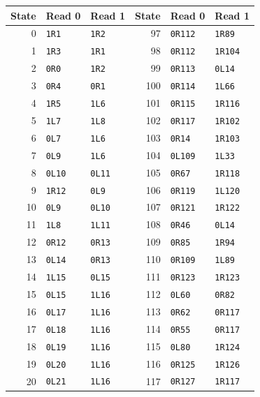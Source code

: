 \begingroup\small\setlength{\tabcolsep}{9pt}
\begin{longtable}{@{}rll@{\hspace{24pt}}rll@{}}
\toprule State & Read 0 & Read 1 & State & Read 0 & Read 1\\\midrule\endhead
0 & \texttt{1R1} & \texttt{1R2} & 97 & \texttt{0R112} & \texttt{1R89}\\
1 & \texttt{1R3} & \texttt{1R1} & 98 & \texttt{0R112} & \texttt{1R104}\\
2 & \texttt{0R0} & \texttt{1R2} & 99 & \texttt{0R113} & \texttt{0L14}\\
3 & \texttt{0R4} & \texttt{0R1} & 100 & \texttt{0R114} & \texttt{1L66}\\
4 & \texttt{1R5} & \texttt{1L6} & 101 & \texttt{0R115} & \texttt{1R116}\\
5 & \texttt{1L7} & \texttt{1L8} & 102 & \texttt{0R117} & \texttt{1R102}\\
6 & \texttt{0L7} & \texttt{1L6} & 103 & \texttt{0R14} & \texttt{1R103}\\
7 & \texttt{0L9} & \texttt{1L6} & 104 & \texttt{0L109} & \texttt{1L33}\\
8 & \texttt{0L10} & \texttt{0L11} & 105 & \texttt{0R67} & \texttt{1R118}\\
9 & \texttt{1R12} & \texttt{0L9} & 106 & \texttt{0R119} & \texttt{1L120}\\
10 & \texttt{0L9} & \texttt{0L10} & 107 & \texttt{0R121} & \texttt{1R122}\\
11 & \texttt{1L8} & \texttt{1L11} & 108 & \texttt{0R46} & \texttt{0L14}\\
12 & \texttt{0R12} & \texttt{0R13} & 109 & \texttt{0R85} & \texttt{1R94}\\
13 & \texttt{0L14} & \texttt{0R13} & 110 & \texttt{0R109} & \texttt{1L89}\\
14 & \texttt{1L15} & \texttt{0L15} & 111 & \texttt{0R123} & \texttt{1R123}\\
15 & \texttt{0L15} & \texttt{1L16} & 112 & \texttt{0L60} & \texttt{0R82}\\
16 & \texttt{0L17} & \texttt{1L16} & 113 & \texttt{0R62} & \texttt{0R117}\\
17 & \texttt{0L18} & \texttt{1L16} & 114 & \texttt{0R55} & \texttt{0R117}\\
18 & \texttt{0L19} & \texttt{1L16} & 115 & \texttt{0L80} & \texttt{1R124}\\
19 & \texttt{0L20} & \texttt{1L16} & 116 & \texttt{0R125} & \texttt{1R126}\\
20 & \texttt{0L21} & \texttt{1L16} & 117 & \texttt{0R127} & \texttt{1R117}\\

\end{longtable}
